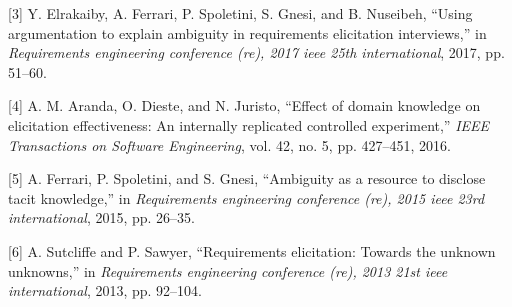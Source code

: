 \documentclass[]{llncs}
\begin{document}
\leavevmode\hypertarget{ref-elrakaiby2017using}{}%
{[}3{]} Y. Elrakaiby, A. Ferrari, P. Spoletini, S. Gnesi, and B.
Nuseibeh, ``Using argumentation to explain ambiguity in requirements
elicitation interviews,'' in \emph{Requirements engineering conference
(re), 2017 ieee 25th international}, 2017, pp. 51--60.

\leavevmode\hypertarget{ref-aranda2016effect}{}%
{[}4{]} A. M. Aranda, O. Dieste, and N. Juristo, ``Effect of domain
knowledge on elicitation effectiveness: An internally replicated
controlled experiment,'' \emph{IEEE Transactions on Software
Engineering}, vol. 42, no. 5, pp. 427--451, 2016.

\leavevmode\hypertarget{ref-ferrari2015ambiguity}{}%
{[}5{]} A. Ferrari, P. Spoletini, and S. Gnesi, ``Ambiguity as a
resource to disclose tacit knowledge,'' in \emph{Requirements
engineering conference (re), 2015 ieee 23rd international}, 2015, pp.
26--35.

\leavevmode\hypertarget{ref-sutcliffe2013requirements}{}%
{[}6{]} A. Sutcliffe and P. Sawyer, ``Requirements elicitation: Towards
the unknown unknowns,'' in \emph{Requirements engineering conference
(re), 2013 21st ieee international}, 2013, pp. 92--104.
\end{document}
